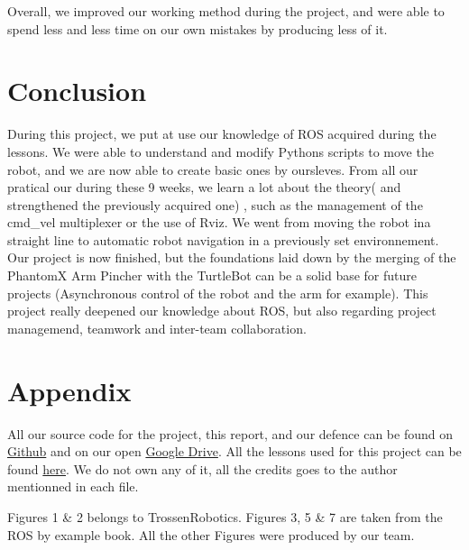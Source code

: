 \documentclass[aps,letterpaper,11pt]{revtex4}
\begin{document}
Overall, we improved our working method during the project, and were able to spend less and less time on our own mistakes by producing less of it. 

\section{Conclusion}

During this project, we put at use our knowledge of ROS acquired during the lessons. We were able to understand and modify Pythons scripts to move the robot, and we are now able to create basic ones by oursleves. From all our pratical our during these 9 weeks, we learn a lot about the theory( and strengthened the previously acquired one) , such as the management of the cmd\_vel multiplexer or the use of Rviz. We went from moving the robot ina straight line to automatic robot navigation in a previously set environnement. Our project is now finished, but the foundations laid down by the merging of the PhantomX Arm Pincher with the TurtleBot can be a solid base for future projects (Asynchronous control of the robot and the arm for example). This project really deepened our knowledge about ROS, but also regarding project managemend, teamwork and inter-team collaboration. 

\section{Appendix}
All our source code for the project, this report, and our defence can be found on \href{https://github.com/AntoineMerlet/Robotics}{Github} and on our open \href{https://drive.google.com/open?id=0B8c8pooKt7IPRXBxaTRpV3JIWFU}{Google Drive}.
All the lessons used for this project can be found \href{https://drive.google.com/open?id=0B8c8pooKt7IPTnRKSmtnVlMtTHc}{here}. We do not own any of it, all the credits goes to the author mentionned in each file.

Figures 1 \& 2 belongs to TrossenRobotics.
Figures 3, 5 \& 7 are taken from the ROS by example book.
All the other Figures were produced by our team.
\end{document}
